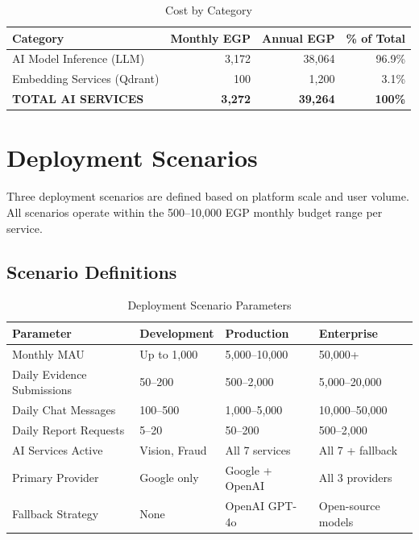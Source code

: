 \documentclass[11pt,a4paper]{article}
\begin{document}
\begin{table}[H]
\centering
\begin{tabular}{|l|r|r|r|}
\hline
\textbf{Category} & \textbf{Monthly EGP} & \textbf{Annual EGP} & \textbf{\% of Total} \\
\hline
AI Model Inference (LLM) & 3,172 & 38,064 & 96.9\% \\
\hline
Embedding Services (Qdrant) & 100 & 1,200 & 3.1\% \\
\hline
\textbf{TOTAL AI SERVICES} & \textbf{3,272} & \textbf{39,264} & \textbf{100\%} \\
\hline
\end{tabular}
\caption{Cost by Category}
\end{table}

\newpage

\section{Deployment Scenarios}

Three deployment scenarios are defined based on platform scale and user volume. All scenarios operate within the 500--10,000 EGP monthly budget range per service.

\subsection{Scenario Definitions}

\begin{table}[H]
\centering
\footnotesize
\begin{tabular}{|l|l|l|l|}
\hline
\textbf{Parameter} & \textbf{Development} & \textbf{Production} & \textbf{Enterprise} \\
\hline
Monthly MAU & Up to 1,000 & 5,000--10,000 & 50,000+ \\
\hline
Daily Evidence Submissions & 50--200 & 500--2,000 & 5,000--20,000 \\
\hline
Daily Chat Messages & 100--500 & 1,000--5,000 & 10,000--50,000 \\
\hline
Daily Report Requests & 5--20 & 50--200 & 500--2,000 \\
\hline
AI Services Active & Vision, Fraud & All 7 services & All 7 + fallback \\
\hline
Primary Provider & Google only & Google + OpenAI & All 3 providers \\
\hline
Fallback Strategy & None & OpenAI GPT-4o & Open-source models \\
\hline
\end{tabular}
\caption{Deployment Scenario Parameters}
\end{table}
\end{document}
